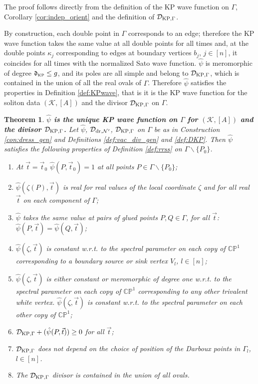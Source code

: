 \documentclass[11pt]{amsart}
\theoremstyle{plain}
\numberwithin{equation}{section}
\newtheorem{theorem}{Theorem}[subsection]
\def \DKP {{\mathcal D}_{\textup{\scriptsize KP},\Gamma}}
\begin{document}
The proof follows directly from the definition of the KP wave function on $\Gamma$, Corollary \ref{cor:indep_orient} and the definition of $\DKP$.

By construction, each double point in $\Gamma$ corresponds to an edge; therefore the KP wave function takes the same value at all double points for all times and, at the double points $\kappa_j$ corresponding to edges at boundary vertices $b_j$, $j\in [n]$, it coincides for all times with the normalized Sato wave function.   
$\hat \psi$ is meromorphic of degree $\mathfrak d_{\mbox{\tiny KP}}\le g$, and its poles are all simple and belong to $\DKP$, which is contained in the union of all the real ovals of $\Gamma$. Therefore $\hat \psi$ satisfies the properties in Definition \ref{def:KPwave}, that is it is the KP wave function for the soliton data $(\mathcal K, [A])$ and the divisor $\DKP$ on $\Gamma$.


\begin{theorem}\label{lemma:KPeffvac}\textbf{$\hat \psi$ is the unique KP wave function on $\Gamma$ for $(\mathcal K, [A])$ and the divisor $\DKP$.}
Let $\hat \psi$, ${\mathcal D}_{\textup{\scriptsize dr}, {\mathcal N}^{\prime}}$, $\DKP$ on $\Gamma$ be as in Construction \ref{con:dress_gen} and Definitions \ref{def:vac_div_gen} and \ref{def:DKP}. Then $\hat \psi$ satisfies the following properties of Definition \ref{def:rrss} on $\Gamma\backslash\{P_0\}$. 
\begin{enumerate}
\item At $\vec t=\vec t_0$ $\hat \psi (P, \vec t_0)=1$ at all points $P\in \Gamma\backslash \{P_0\} $;
\item ${\hat \psi} (\zeta(P), \vec t)$ is real for real values of the local coordinate $\zeta$ and for all real $\vec t$ on each component of $\Gamma$;
\item $\hat \psi$ takes the same value at pairs of glued points $P,Q\in \Gamma$, for all $\vec t$:  $\hat \psi(P, \vec t) = \hat \psi(Q, \vec t)$;
\item $\hat \psi(\zeta, \vec t)$ is constant w.r.t. to the spectral parameter on each copy of $\mathbb{CP}^1$ corresponding to a boundary source or sink vertex $V_{l}$, $l\in [n]$;
\item $\hat \psi(\zeta, \vec t)$ is either constant or meromorphic of degree one w.r.t. to the spectral parameter on each copy of $\mathbb{CP}^1$ corresponding to any other trivalent white vertex. $\hat \psi(\zeta, \vec t)$ is constant w.r.t. to the spectral parameter on each other copy of $\mathbb{CP}^1$; 
\item $\DKP+(\hat\psi(P,\vec t))\ge 0$ for all $\vec t$;
\item $\DKP$ does not depend on the choice of position of the Darboux points in $\Gamma_l$, $l\in [n]$.
\item The $\DKP$ divisor is contained in the union of all ovals.   
\end{enumerate}
\end{theorem}
\end{document}
